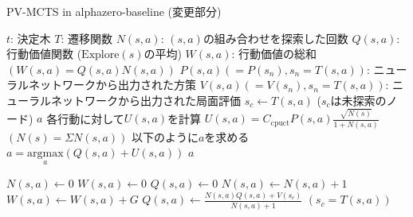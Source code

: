 \begin{algorithm}
    \caption{PV-MCTS in alphazero-baseline (変更部分)}
    \label{alg:base}
    \begin{algorithmic}[1]
    \small
        \State $t$: 決定木
        \State $T$: 遷移関数
        \State $N(s, a)$: $(s, a)$の組み合わせを探索した回数
        \State $Q(s, a)$: 行動価値関数 ($\textrm{Explore}(s)$の平均)
        \State $W(s, a)$: 行動価値の総和$(W(s, a)=Q(s, a)N(s, a))$
        \State $P(s, a)(=P(s_n), s_n=T(s, a))$: 
        \State ニューラルネットワークから出力された方策
        \State $V(s, a)(=V(s_n), s_n=T(s, a))$: 
        \State ニューラルネットワークから出力された局面評価
                \State $s_c \gets T(s, a)$ ($s_c$は未探索のノード)
                \State {}
                \State \Return $a$
            \Else
                \State 各行動に対して$U(s, a)$を計算
                \State \underline{$U(s, a)= C_{\textrm{cpuct}}P(s, a)\frac{\sqrt{N(s)}}{1+N(s, a)}$}
                \State $(N(s)=\Sigma N(s, a))$
                \State 以下のように$a$を求める
                \State $a = {\underset{a}{\textrm{argmax}}} (Q(s, a)+U(s, a))$
                \State \Return $a$
                
            \EndIf
        \EndFunction
                \State $N(s, a) \gets 0$
                \State $W(s, a) \gets 0$
                \State $Q(s, a) \gets 0$
            \EndFor
        \EndFunction
                \State $N(s, a) \gets N(s, a)+1$
                \State $W(s, a) \gets W(s, a)+G$
                \State \underline{$Q(s, a) \gets \frac{N(s, a)Q(s, a)+V(s_c)}{N(s, a)+1}$}
				\State $(s_c = T(s, a))$
            \EndFor
        \EndFunction
    \end{algorithmic}
\end{algorithm}